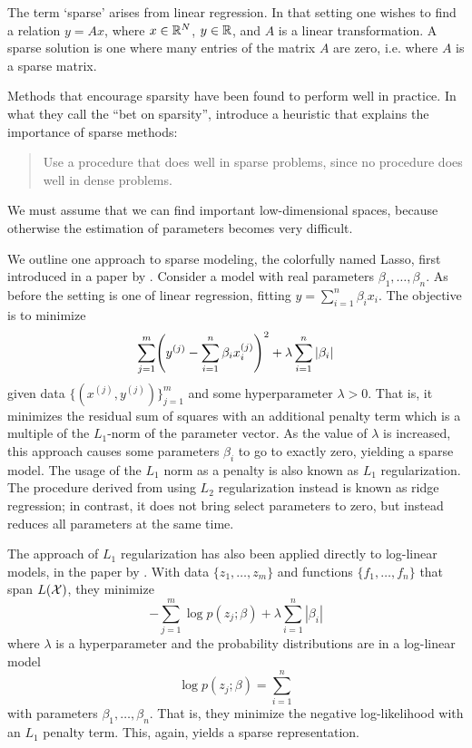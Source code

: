 \documentclass[cclicense]{hmcthesis}
\numberwithin{equation}{chapter}
\numberwithin{ucounter}{chapter}
\begin{document}
    \begin{example}
        The term `sparse' arises from linear regression.  In that setting one
        wishes to find a relation $y = Ax$, where $x \in \mathbb{R}^N$, $y \in \mathbb{R}$, and
        $A$ is a linear transformation.  A sparse solution is one where many
        entries of the matrix $A$ are zero, i.e. where $A$ is a sparse matrix.
    \end{example}
    
    Methods that encourage sparsity have been found to perform well in practice.
    In what they call the ``bet on sparsity'', \citet{EOSL} introduce a
    heuristic that explains the importance of sparse methods:
    \begin{quote}
        Use a procedure that does well in sparse problems, since no procedure
        does well in dense problems.
    \end{quote}
    \noindent We must assume that we can find important low-dimensional spaces,
    because otherwise the estimation of parameters becomes very difficult.

    We outline one approach to sparse modeling, the colorfully named Lasso, first
    introduced in a paper by \citet{LASSO}.  Consider a model with real
    parameters $\beta_1, \ldots, \beta_n$.  As before the setting is one of
    linear regression, fitting $y = \sum_{i=1}^n \beta_i x_i$.  The objective is to
    minimize
    \[
        \sum_{j=1}^m \pdel*{y^{(j)} - \sum_{i=1}^n \beta_i x_i^{(j)}}^2 +
        \lambda \sum_{i=1}^n |\beta_i|
    \]
    given data $\{(x^{(j)}, y^{(j)})\}_{j=1}^m$ and some hyperparameter $\lambda
    > 0$.  That is, it minimizes the residual sum of squares with an additional
    penalty term which is a multiple of the $L_1$-norm of the parameter vector.
    As the value of $\lambda$ is increased, this approach causes some parameters
    $\beta_i$ to go to exactly zero, yielding a sparse model.  The usage of the
    $L_1$ norm as a penalty is also known as $L_1$ regularization.  The
    procedure derived from using $L_2$ regularization instead is known as ridge
    regression; in contrast, it does not bring select parameters to zero, but
    instead reduces all parameters at the same time.

    The approach of $L_1$ regularization has also been applied directly to
    log-linear models, in the paper by \citet{SPEC}.  With data $\{z_1, \ldots,
    z_m\}$ and functions $\{f_1, \ldots, f_n\}$ that span $L(\mathcal{X})$, they
    minimize
    \[
        - \sum_{j=1}^m \log p(z_j; \beta) + \lambda
        \sum_{i=1}^n |\beta_i| 
    \]
    where $\lambda$ is a hyperparameter and the probability distributions are in
    a log-linear model
    \[
        \log p (z_j; \beta) = \sum_{i=1}^n
    \]
    with parameters $\beta_1, \ldots, \beta_n$.  That is, they minimize the
    negative log-likelihood with an $L_1$ penalty term.  This, again, yields a
    sparse representation.
\end{document}
